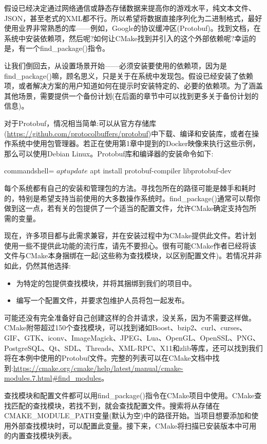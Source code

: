 假设已经决定通过网络通信或静态存储数据来提高你的游戏水平，纯文本文件、JSON，甚至老式的XML都不行。所以希望将数据直接序列化为二进制格式，最好使用业界非常熟悉的库——例如，Google的协议缓冲区(Protobuf)。找到文档，在系统中安装依赖项，然后呢?如何让CMake找到并引入的这个外部依赖呢?幸运的是，有一个find\_package()指令。

让我们倒回去，从设置场景开始——必须安装要使用的依赖项，因为是find\_package()嘛，顾名思义，只是关于在系统中发现包。假设已经安装了依赖项，或者解决方案的用户知道如何在提示时安装特定的、必要的依赖项。为了涵盖其他场景，需要提供一个备份计划(在后面的章节中可以找到更多关于备份计划的信息)。

对于Protobuf，情况相当简单:可以从官方存储库(\url{https://github.com/protocolbuffers/protobuf})中下载、编译和安装库，或者在操作系统中使用包管理器。若正在使用第1章中提到的Docker映像来执行这些示例，那么可以使用Debian Linux。Protobuf库和编译器的安装命令如下:

\begin{tcblisting}{commandshell={}}
$ apt update
$ apt install protobuf-compiler libprotobuf-dev
\end{tcblisting}

每个系统都有自己的安装和管理包的方法。寻找包所在的路径可能是棘手和耗时的，特别是希望支持当前使用的大多数操作系统时。find\_package()通常可以帮你做到这一点，若有关的包提供了一个适当的配置文件，允许CMake确定支持包所需的变量。

现在，许多项目都与此需求兼容，并在安装过程中为CMake提供此文件。若计划使用一些不提供此功能的流行库，请先不要担心。很有可能CMake作者已经将该文件与CMake本身捆绑在一起(这些称为查找模块，以区别配置文件)。若情况并非如此，仍然其他选择:

\begin{itemize}
\item 
为特定的包提供查找模块，并将其捆绑到我们的项目中。

\item 
编写一个配置文件，并要求包维护人员将包一起发布。
\end{itemize}

可能还没有完全准备好自己创建这样的合并请求，没关系，因为不需要这样做。CMake附带超过150个查找模块，可以找到诸如Boost、bzip2、curl、curses、GIF、GTK、iconv、ImageMagick、JPEG、Lua、OpenGL、OpenSSL、PNG、PostgreSQL、Qt、SDL、Threads、XML-RPC、X11和zlib等库，还可以找到我们将在本例中使用的Protobuf文件。完整的列表可以在CMake文档中找到:\url{https://cmake.org/cmake/help/latest/manual/cmake-modules.7.html\#find_modules}。

查找模块和配置文件都可以用find\_package()指令在CMake项目中使用。CMake查找匹配的查找模块，若找不到，就会查找配置文件。搜索将从存储在CMAKE\_MODULE\_PATH变量(默认为空)中的路径开始。当项目想要添加和使用外部查找模块时，可以配置此变量。接下来，CMake将扫描已安装版本中可用的内置查找模块列表。


